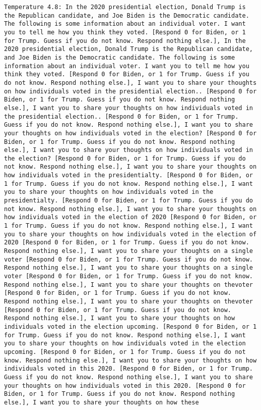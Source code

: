 \begin{lstlisting}[label=lst:poor_performing_prompts]
	Temperature 4.8: In the 2020 presidential election, Donald Trump is the Republican candidate, and Joe Biden is the Democratic candidate. The following is some information about an individual voter. I want you to tell me how you think they voted. [Respond 0 for Biden, or 1 for Trump. Guess if you do not know. Respond nothing else.], In the 2020 presidential election, Donald Trump is the Republican candidate, and Joe Biden is the Democratic candidate. The following is some information about an individual voter. I want you to tell me how you think they voted. [Respond 0 for Biden, or 1 for Trump. Guess if you do not know. Respond nothing else.], I want you to share your thoughts on how individuals voted in the presidential election.. [Respond 0 for Biden, or 1 for Trump. Guess if you do not know. Respond nothing else.], I want you to share your thoughts on how individuals voted in the presidential election.. [Respond 0 for Biden, or 1 for Trump. Guess if you do not know. Respond nothing else.], I want you to share your thoughts on how individuals voted in the election? [Respond 0 for Biden, or 1 for Trump. Guess if you do not know. Respond nothing else.], I want you to share your thoughts on how individuals voted in the election? [Respond 0 for Biden, or 1 for Trump. Guess if you do not know. Respond nothing else.], I want you to share your thoughts on how individuals voted in the presidentialty. [Respond 0 for Biden, or 1 for Trump. Guess if you do not know. Respond nothing else.], I want you to share your thoughts on how individuals voted in the presidentialty. [Respond 0 for Biden, or 1 for Trump. Guess if you do not know. Respond nothing else.], I want you to share your thoughts on how individuals voted in the election of 2020 [Respond 0 for Biden, or 1 for Trump. Guess if you do not know. Respond nothing else.], I want you to share your thoughts on how individuals voted in the election of 2020 [Respond 0 for Biden, or 1 for Trump. Guess if you do not know. Respond nothing else.], I want you to share your thoughts on a single voter [Respond 0 for Biden, or 1 for Trump. Guess if you do not know. Respond nothing else.], I want you to share your thoughts on a single voter [Respond 0 for Biden, or 1 for Trump. Guess if you do not know. Respond nothing else.], I want you to share your thoughts on thevoter [Respond 0 for Biden, or 1 for Trump. Guess if you do not know. Respond nothing else.], I want you to share your thoughts on thevoter [Respond 0 for Biden, or 1 for Trump. Guess if you do not know. Respond nothing else.], I want you to share your thoughts on how individuals voted in the election upcoming. [Respond 0 for Biden, or 1 for Trump. Guess if you do not know. Respond nothing else.], I want you to share your thoughts on how individuals voted in the election upcoming. [Respond 0 for Biden, or 1 for Trump. Guess if you do not know. Respond nothing else.], I want you to share your thoughts on how individuals voted in this 2020. [Respond 0 for Biden, or 1 for Trump. Guess if you do not know. Respond nothing else.], I want you to share your thoughts on how individuals voted in this 2020. [Respond 0 for Biden, or 1 for Trump. Guess if you do not know. Respond nothing else.], I want you to share your thoughts on how these 
\end{lstlisting}
